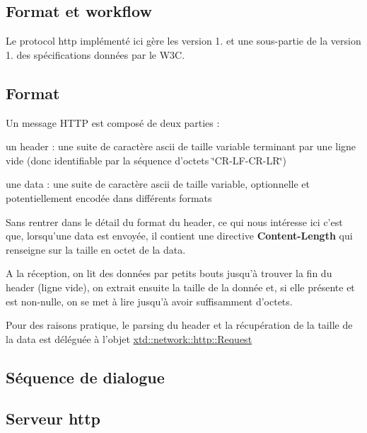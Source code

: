 \par
 \hypertarget{index_ssec_http_cnx}{}\subsection{Format et workflow}\label{index_ssec_http_cnx}
Le protocol http implémenté ici gère les version 1. et une sous-\/partie de la version 1. des spécifications données par le W3\-C. \subsection*{Format}

Un message H\-T\-T\-P est composé de deux parties \-:
\begin{DoxyItemize}
\item un header \-: une suite de caractère ascii de taille variable terminant par une ligne vide (donc identifiable par la séquence d'octets \char`\"{}\-C\-R-\/\-L\-F-\/\-C\-R-\/\-L\-R\char`\"{})
\item une data \-: une suite de caractère ascii de taille variable, optionnelle et potentiellement encodée dans différents formats
\end{DoxyItemize}

Sans rentrer dans le détail du format du header, ce qui nous intéresse ici c'est que, lorsqu'une data est envoyée, il contient une directive {\bfseries Content-\/\-Length} qui renseigne sur la taille en octet de la data.

A la réception, on lit des données par petits bouts jusqu'à trouver la fin du header (ligne vide), on extrait ensuite la taille de la donnée et, si elle présente et est non-\/nulle, on se met à lire jusqu'à avoir suffisamment d'octets.

Pour des raisons pratique, le parsing du header et la récupération de la taille de la data est déléguée à l'objet \hyperlink{classxtd_1_1network_1_1http_1_1Request}{xtd\-::network\-::http\-::\-Request}

\subsection*{Séquence de dialogue }



\par
 \hypertarget{index_ssec_http_server}{}\subsection{Serveur http}\label{index_ssec_http_server}
\par
\par
 
